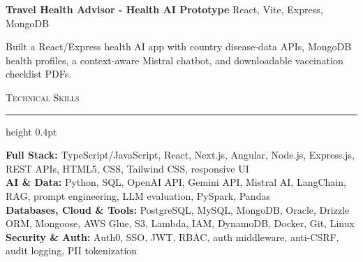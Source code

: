 \documentclass[letterpaper,11pt]{article}
\newcommand{\resumesection}[1]{%
  \par\vspace{2pt}%
  {\large\scshape #1}\par\vspace{2pt}%
  \hrule height 0.4pt\vspace{2pt}%
}
\newcommand{\projectHeading}[2]{
  \textbf{#1} \hfill #2
}
\begin{document}
\projectHeading{Travel Health Advisor - Health AI Prototype}{React, Vite, Express, MongoDB}
\begin{tightitemize}
  \item Built a React/Express health AI app with country disease-data APIs, MongoDB health profiles, a context-aware Mistral chatbot, and downloadable vaccination checklist PDFs.
\end{tightitemize}

\resumesection{Technical Skills}
\textbf{Full Stack:} TypeScript/JavaScript, React, Next.js, Angular, Node.js, Express.js, REST APIs, HTML5, CSS, Tailwind CSS, responsive UI\\
\textbf{AI \& Data:} Python, SQL, OpenAI API, Gemini API, Mistral AI, LangChain, RAG, prompt engineering, LLM evaluation, PySpark, Pandas\\
\textbf{Databases, Cloud \& Tools:} PostgreSQL, MySQL, MongoDB, Oracle, Drizzle ORM, Mongoose, AWS Glue, S3, Lambda, IAM, DynamoDB, Docker, Git, Linux\\
\textbf{Security \& Auth:} Auth0, SSO, JWT, RBAC, auth middleware, anti-CSRF, audit logging, PII tokenization
\end{document}
